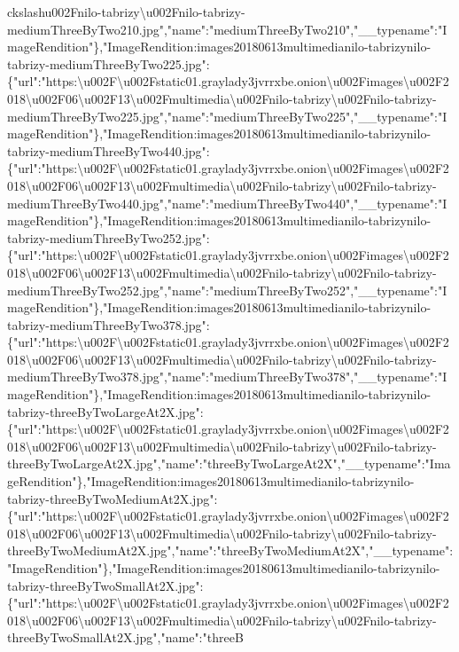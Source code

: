 ckslash{}u002Fnilo-tabrizy\textbackslash{}u002Fnilo-tabrizy-mediumThreeByTwo210.jpg","name":"mediumThreeByTwo210","\_\_typename":"ImageRendition"\},"ImageRendition:images20180613multimedianilo-tabrizynilo-tabrizy-mediumThreeByTwo225.jpg":\{"url":"https:\textbackslash{}u002F\textbackslash{}u002Fstatic01.graylady3jvrrxbe.onion\textbackslash{}u002Fimages\textbackslash{}u002F2018\textbackslash{}u002F06\textbackslash{}u002F13\textbackslash{}u002Fmultimedia\textbackslash{}u002Fnilo-tabrizy\textbackslash{}u002Fnilo-tabrizy-mediumThreeByTwo225.jpg","name":"mediumThreeByTwo225","\_\_typename":"ImageRendition"\},"ImageRendition:images20180613multimedianilo-tabrizynilo-tabrizy-mediumThreeByTwo440.jpg":\{"url":"https:\textbackslash{}u002F\textbackslash{}u002Fstatic01.graylady3jvrrxbe.onion\textbackslash{}u002Fimages\textbackslash{}u002F2018\textbackslash{}u002F06\textbackslash{}u002F13\textbackslash{}u002Fmultimedia\textbackslash{}u002Fnilo-tabrizy\textbackslash{}u002Fnilo-tabrizy-mediumThreeByTwo440.jpg","name":"mediumThreeByTwo440","\_\_typename":"ImageRendition"\},"ImageRendition:images20180613multimedianilo-tabrizynilo-tabrizy-mediumThreeByTwo252.jpg":\{"url":"https:\textbackslash{}u002F\textbackslash{}u002Fstatic01.graylady3jvrrxbe.onion\textbackslash{}u002Fimages\textbackslash{}u002F2018\textbackslash{}u002F06\textbackslash{}u002F13\textbackslash{}u002Fmultimedia\textbackslash{}u002Fnilo-tabrizy\textbackslash{}u002Fnilo-tabrizy-mediumThreeByTwo252.jpg","name":"mediumThreeByTwo252","\_\_typename":"ImageRendition"\},"ImageRendition:images20180613multimedianilo-tabrizynilo-tabrizy-mediumThreeByTwo378.jpg":\{"url":"https:\textbackslash{}u002F\textbackslash{}u002Fstatic01.graylady3jvrrxbe.onion\textbackslash{}u002Fimages\textbackslash{}u002F2018\textbackslash{}u002F06\textbackslash{}u002F13\textbackslash{}u002Fmultimedia\textbackslash{}u002Fnilo-tabrizy\textbackslash{}u002Fnilo-tabrizy-mediumThreeByTwo378.jpg","name":"mediumThreeByTwo378","\_\_typename":"ImageRendition"\},"ImageRendition:images20180613multimedianilo-tabrizynilo-tabrizy-threeByTwoLargeAt2X.jpg":\{"url":"https:\textbackslash{}u002F\textbackslash{}u002Fstatic01.graylady3jvrrxbe.onion\textbackslash{}u002Fimages\textbackslash{}u002F2018\textbackslash{}u002F06\textbackslash{}u002F13\textbackslash{}u002Fmultimedia\textbackslash{}u002Fnilo-tabrizy\textbackslash{}u002Fnilo-tabrizy-threeByTwoLargeAt2X.jpg","name":"threeByTwoLargeAt2X","\_\_typename":"ImageRendition"\},"ImageRendition:images20180613multimedianilo-tabrizynilo-tabrizy-threeByTwoMediumAt2X.jpg":\{"url":"https:\textbackslash{}u002F\textbackslash{}u002Fstatic01.graylady3jvrrxbe.onion\textbackslash{}u002Fimages\textbackslash{}u002F2018\textbackslash{}u002F06\textbackslash{}u002F13\textbackslash{}u002Fmultimedia\textbackslash{}u002Fnilo-tabrizy\textbackslash{}u002Fnilo-tabrizy-threeByTwoMediumAt2X.jpg","name":"threeByTwoMediumAt2X","\_\_typename":"ImageRendition"\},"ImageRendition:images20180613multimedianilo-tabrizynilo-tabrizy-threeByTwoSmallAt2X.jpg":\{"url":"https:\textbackslash{}u002F\textbackslash{}u002Fstatic01.graylady3jvrrxbe.onion\textbackslash{}u002Fimages\textbackslash{}u002F2018\textbackslash{}u002F06\textbackslash{}u002F13\textbackslash{}u002Fmultimedia\textbackslash{}u002Fnilo-tabrizy\textbackslash{}u002Fnilo-tabrizy-threeByTwoSmallAt2X.jpg","name":"threeB